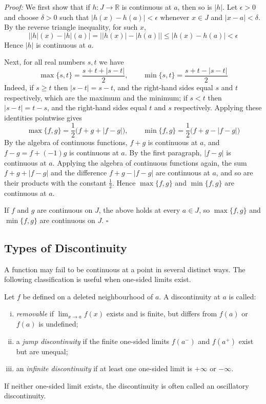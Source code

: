 \documentclass[a4paper,11pt,abstracton]{scrartcl}
\newcommand{\RR}{\mathbb{R}}
\theoremstyle{dotlessP}
\theoremstyle{dotlessS}
\theoremstyle{remark}
\theoremstyle{definition}
\begin{document}
\begin{claim_box}
\textit{Proof:}
We first show that if $h:J\rightarrow\RR$ is continuous at $a$, then so is $|h|$. Let $\epsilon>0$ and choose $\delta>0$ such that $|h(x)-h(a)|<\epsilon$ whenever $x\in J$ and $|x-a|<\delta$. By the reverse triangle inequality, for such $x$,
\[
    \bigl||h|(x)-|h|(a)\bigr|=\bigl||h(x)|-|h(a)|\bigr|\le|h(x)-h(a)|<\epsilon
\]
Hence $|h|$ is continuous at $a$.

Next, for all real numbers $s,t$ we have
\[
    \max\{s,t\}=\frac{s+t+|s-t|}2,
    \qquad
    \min\{s,t\}=\frac{s+t-|s-t|}2
\]
Indeed, if $s\ge t$ then $|s-t|=s-t$, and the right-hand sides equal $s$ and $t$ respectively, which are the maximum and the minimum; if $s<t$ then $|s-t|=t-s$, and the right-hand sides equal $t$ and $s$ respectively. Applying these identities pointwise gives
\[
    \max\{f,g\}=\frac12\bigl(f+g+|f-g|\bigr),
    \qquad
    \min\{f,g\}=\frac12\bigl(f+g-|f-g|\bigr)
\]
By the algebra of continuous functions, $f+g$ is continuous at $a$, and $f-g=f+(-1)g$ is continuous at $a$. By the first paragraph, $|f-g|$ is continuous at $a$. Applying the algebra of continuous functions again, the sum $f+g+|f-g|$ and the difference $f+g-|f-g|$ are continuous at $a$, and so are their products with the constant $\tfrac12$. Hence $\max\{f,g\}$ and $\min\{f,g\}$ are continuous at $a$.

If $f$ and $g$ are continuous on $J$, the above holds at every $a\in J$, so $\max\{f,g\}$ and $\min\{f,g\}$ are continuous on $J$.
\hfill$\square$
\end{claim_box}


\subsection{Types of Discontinuity}

A function may fail to be continuous at a point in several distinct
ways. The following classification is useful when one-sided limits
exist.

\begin{definition_box}
Let $f$ be defined on a deleted neighbourhood of $a$.
A discontinuity at $a$ is called:
\begin{enumerate}[(i)]
 \item \emph{removable} if $\lim_{x\to a}f(x)$ exists and is finite,
 but differs from $f(a)$ or $f(a)$ is undefined;
 \item a \emph{jump discontinuity} if the finite one-sided limits
 $f(a^-)$ and $f(a^+)$ exist but are unequal;
 \item an \emph{infinite discontinuity} if at least one one-sided
 limit is $+\infty$ or $-\infty$.
\end{enumerate}
If neither one-sided limit exists, the discontinuity is often called
an oscillatory discontinuity.
\end{definition_box}
\end{document}
